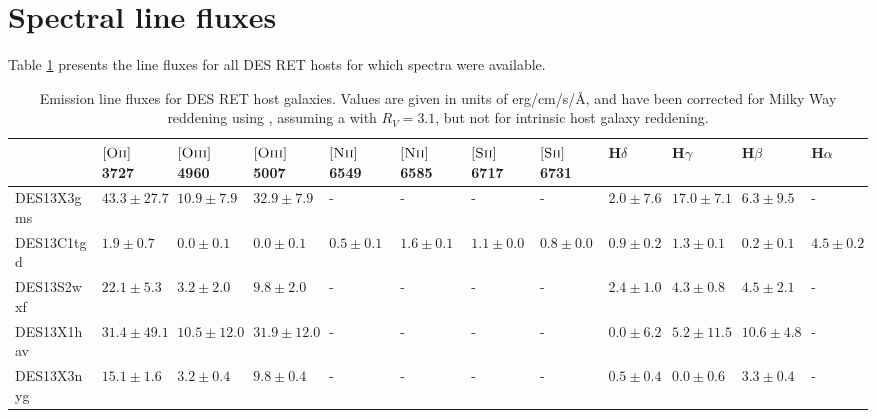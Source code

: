 \documentclass[fleqn,usenatbib,]{mnras}
\newcommand{\halpha}[0]{H$\alpha$}
\newcommand{\hbeta}[0]{H$\beta$}
\newcommand{\hgamma}[0]{H$\gamma$}
\newcommand{\hdelta}[0]{H$\delta$}
\newcommand{\OII}[0]{$[\textnormal{\textsc{Oii}}]$}
\newcommand{\OIII}[0]{$[\textnormal{\textsc{Oiii}}]$}
\newcommand{\SII}[0]{$[\textnormal{\textsc{Sii}}]$}
\newcommand{\NII}[0]{$[\textnormal{\textsc{Nii}}]$}
\begin{document}

\newpage
\appendix
\onecolumn
\section{Spectral line fluxes}
Table \ref{tab:fluxes} presents the line fluxes for all DES RET hosts for which spectra were available.

\begin{table}

\caption{Emission line fluxes for DES RET host galaxies. Values are given in units of erg/cm/s/\AA, and have been corrected for Milky Way reddening using \citet{Schlegel1998}, assuming a \citet{Cardelli1989} with $R_V = 3.1$, but not for intrinsic host galaxy reddening.\label{tab:fluxes}}
\setlength{\tabcolsep}{3pt}
\begin{tabular}{llllllllllll}
\toprule
{} &              \OII 3727 &             \OIII 4960 &              \OIII 5007 &             \NII 6549 &             \NII 6585 &             \SII 6717 &             \SII 6731 &           \hdelta &            \hgamma &             \hbeta &            \halpha \\
\midrule
DES13X3gms &  $43.3 \pm 27.7$ &   $10.9 \pm 7.9$ &    $32.9 \pm 7.9$ &               - &               - &               - &               - &   $2.0 \pm 7.6$ &   $17.0 \pm 7.1$ &    $6.3 \pm 9.5$ &                - \\
DES13C1tgd &    $1.9 \pm 0.7$ &    $0.0 \pm 0.1$ &     $0.0 \pm 0.1$ &   $0.5 \pm 0.1$ &   $1.6 \pm 0.1$ &   $1.1 \pm 0.0$ &   $0.8 \pm 0.0$ &   $0.9 \pm 0.2$ &    $1.3 \pm 0.1$ &    $0.2 \pm 0.1$ &    $4.5 \pm 0.2$ \\
DES13S2wxf &   $22.1 \pm 5.3$ &    $3.2 \pm 2.0$ &     $9.8 \pm 2.0$ &               - &               - &               - &               - &   $2.4 \pm 1.0$ &    $4.3 \pm 0.8$ &    $4.5 \pm 2.1$ &                - \\
DES13X1hav &  $31.4 \pm 49.1$ &  $10.5 \pm 12.0$ &   $31.9 \pm 12.0$ &               - &               - &               - &               - &   $0.0 \pm 6.2$ &   $5.2 \pm 11.5$ &   $10.6 \pm 4.8$ &                - \\
DES13X3nyg &   $15.1 \pm 1.6$ &    $3.2 \pm 0.4$ &     $9.8 \pm 0.4$ &               - &               - &               - &               - &   $0.5 \pm 0.4$ &    $0.0 \pm 0.6$ &    $3.3 \pm 0.4$ &                - \\

\end{tabular}
\end{table}
\end{document}

